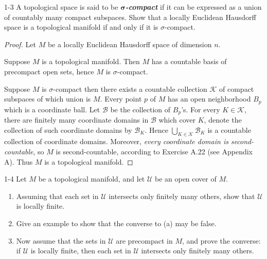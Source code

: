 \begin{problem}{1-3}
    A topological space is said to be \textbf{\emph{\( \boldsymbol\sigma \)-compact}} if it can be expressed as a union of countably many compact subspaces. Show that a locally Euclidean Hausdorff space is a topological manifold if and only if it is \( \sigma \)-compact.
\end{problem}

\begin{proof}
    Let \( M \) be a locally Euclidean Hausdorff space of dimension \( n \).

    Suppose \( M \) is a topological manifold. Then \( M \) has a countable basis of precompact open sets, hence \( M \) is \( \sigma \)-compact.

    Suppose \( M \) is \( \sigma \)-compact then there exists a countable collection \( \mathscr{K} \) of compact subspaces of which union is \( M \). Every point \( p \) of \( M \) has an open neighborhood \( B_{p} \) which is a coordinate ball. Let \( \mathscr{B} \) be the collection of \( B_{p} \)'s. For every \( K \in \mathscr{K} \), there are finitely many coordinate domains in \( \mathscr{B} \) which cover \( K \), denote the collection of such coordinate domains by \( \mathscr{B}_{K} \). Hence \( \bigcup_{K \in \mathscr{K}} \mathscr{B}_{K} \) is a countable collection of coordinate domains. Moreover, \textit{every coordinate domain is second-countable}, so \( M \) is second-countable, according to Exercise A.22 (see Appendix A). Thus \( M \) is a topological manifold.
\end{proof}

\begin{problem}{1-4}
    Let \( M \) be a topological manifold, and let \( \mathcal{U} \) be an open cover of \( M \).
    \begin{enumerate}[itemsep=0pt,label={(\alph*)}]
        \item Assuming that each set in \( \mathcal{U} \) intersects only finitely many others, show that \( \mathcal{U} \) is locally finite.
        \item Give an example to show that the converse to (a) may be false.
        \item Now assume that the sets in \( \mathcal{U} \) are precompact in \( M \), and prove the converse: if \( \mathcal{U} \) is locally finite, then each set in \( \mathcal{U} \) intersects only finitely many others.
    \end{enumerate}
\end{problem}

